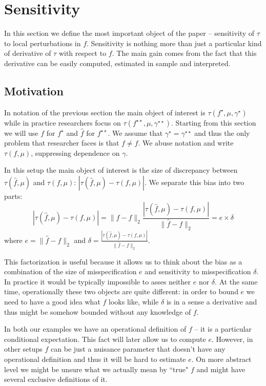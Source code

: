 \documentclass[12pt]{article}
\theoremstyle{plain}
\begin{document}
\section{Sensitivity}

In this section we define the most important object of the paper -- sensitivity of $\tau$ to local perturbations in $f$. Sensitivity is nothing more than just a particular kind of derivative of $\tau$ with respect to $f$. The main gain comes from the fact that this derivative can be easily computed, estimated in sample and interpreted.

\subsection{Motivation}

In notation of the previous section the main object of interest is $\tau(f^{\star}, \mu,\gamma^{\star})$ while in practice researchers focus on $\tau(f^{\star\star},\mu,\gamma^{\star\star})$. Starting from this section we will use $f$ for $f^{\star}$ and $\hat f$ for $f^{\star\star}$. We assume that $\gamma^{\star} = \gamma^{\star\star}$ and thus the only problem that researcher faces is that $f \ne \hat f$. We abuse notation and write $\tau(f,\mu)$, suppressing dependence on $\gamma$.

In this setup the main object of interest is the size of  discrepancy between $\tau(\hat f,\mu)$ and $\tau(f, \mu)$: $|\tau(\hat f, \mu) - \tau(f, \mu)|$. We separate this bias into two parts:
\begin{equation}
|\tau(\hat f, \mu) - \tau(f, \mu)| = \|\hat f -f\|_2 \frac{|\tau(\hat f, \mu) - \tau(f, \mu)|}{\|\hat f -f\|_2} = e\times \delta
\end{equation}
 where $e = \|\hat f -f\|_2$ and $\delta =  \frac{|\tau(\hat f, \mu) - \tau(f, \mu)|}{\|\hat f -f\|_2} $. 
 
This factorization is useful because it allows us to think about the bias as a combination of the size of misspecification $e$ and sensitivity to misspecification $\delta$. In practice it would be typically impossible to asses neither $e$ nor $\delta$. At the same time, operationally these two objects are quite different: in order to bound $e$ we need to have a good idea what $f$ looks like, while $\delta$ is in a sense a derivative and thus might be somehow bounded without any knowledge of $f$.

In both our examples we have an operational definition of $f$ -- it is a particular conditional expectation. This fact will later allow us to compute $e$. However, in other setups $f$ can be just a nuisance parameter that doesn't have any operational definition and thus it will be hard to estimate $e$. On more abstract level we might be unsure what we actually mean by ``true" $f$ and might have several exclusive definitions of it. 
\end{document}
